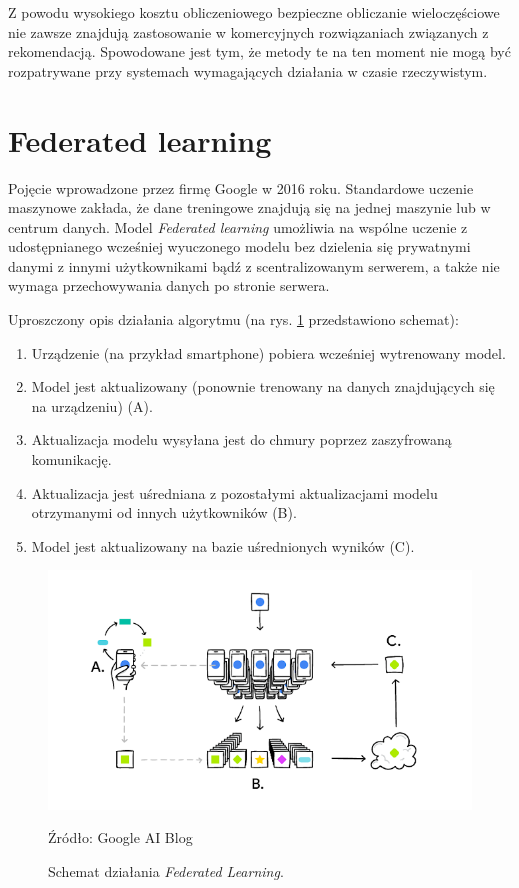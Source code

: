 Z powodu wysokiego kosztu obliczeniowego bezpieczne obliczanie wieloczęściowe nie zawsze znajdują zastosowanie w komercyjnych rozwiązaniach związanych z rekomendacją. Spowodowane jest tym, że metody te na ten moment nie mogą być rozpatrywane przy systemach wymagających działania w czasie rzeczywistym. \cite{secureMultipartyComputation}

\section{Federated learning}
\label{section:federatedLearning}

Pojęcie wprowadzone przez firmę Google w 2016 roku. Standardowe uczenie maszynowe zakłada, że dane treningowe znajdują się na jednej maszynie lub w centrum danych. Model \textit{Federated learning} umożliwia na wspólne uczenie z udostępnianego wcześniej wyuczonego modelu bez dzielenia się prywatnymi danymi z innymi użytkownikami bądź z scentralizowanym serwerem, a także nie wymaga przechowywania danych po stronie serwera.

Uproszczony opis działania algorytmu (na rys. \ref{fig:fl} przedstawiono schemat):
\begin{enumerate}
    \item Urządzenie (na przykład smartphone) pobiera wcześniej wytrenowany model.
    \item Model jest aktualizowany (ponownie trenowany na danych znajdujących się na urządzeniu) (A).
    \item Aktualizacja modelu wysyłana jest do chmury poprzez zaszyfrowaną komunikację.
    \item Aktualizacja jest uśredniana z pozostałymi aktualizacjami modelu otrzymanymi od innych użytkowników (B).
    \item Model jest aktualizowany na bazie uśrednionych wyników (C).
\end{enumerate}

\begin{figure}
    \centering
    \includegraphics[scale=0.6]{images/fl.png}
    \caption{Schemat działania \textit{Federated Learning}.}    Źródło: Google AI Blog \cite{fedderatedLearning}
    \label{fig:fl}
\end{figure}

